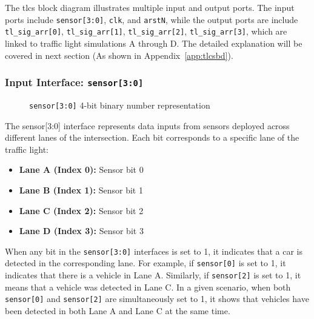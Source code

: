The \acs{tlcs} block diagram illustrates multiple input and output ports. The input ports include \texttt{sensor[3:0]}, \texttt{clk}, and \texttt{arstN}, while the output ports are include \texttt{tl\_sig\_arr[0]}, \texttt{tl\_sig\_arr[1]}, \texttt{tl\_sig\_arr[2]}, \texttt{tl\_sig\_arr[3]}, which are linked to traffic light simulations A through D. The detailed explanation will be covered in next section (As shown in Appendix~\ref{app:tlcsbd}).
\subsubsection{Input Interface: \texttt{sensor[3:0]}}

\begin{figure}[H]
	\centering
	\caption{\texttt{sensor[3:0]} 4-bit binary number representation}
	\label{block:sync1}
	\par
\end{figure}
The sensor[3:0] interface represents data inputs from sensors deployed across different lanes of the intersection.
Each bit corresponds to a specific lane of the traffic light:

\begin{itemize}

	\item \textbf{Lane A (Index 0):} Sensor bit 0
	\item \textbf{Lane B (Index 1):} Sensor bit 1
	\item \textbf{Lane C (Index 2):} Sensor bit 2
	\item \textbf{Lane D (Index 3):} Sensor bit 3

\end{itemize}

When any bit in the \texttt{sensor[3:0]} interfaces is set to 1, it indicates that a car is detected in the corresponding lane. For example, if \texttt{sensor[0]} is set to 1, it indicates that there is a vehicle in Lane A. Similarly, if \texttt{sensor[2]} is set to 1, it means that a vehicle was detected in Lane C. In a given scenario, when both \texttt{sensor[0]} and \texttt{sensor[2]} are simultaneously set to 1, it shows that vehicles have been detected in both Lane A and Lane C at the same time.

